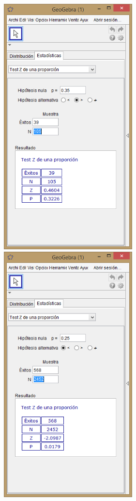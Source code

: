 \documentclass[10pt,a4paper]{article}\usepackage[]{graphicx}\usepackage[]{color}
\begin{document}
    \begin{center}
    \includegraphics[width=7cm]{../fig/Tut08-09.png}\qquad
    \includegraphics[width=7cm]{../fig/Tut08-10.png}
    \end{center}
\end{document}

